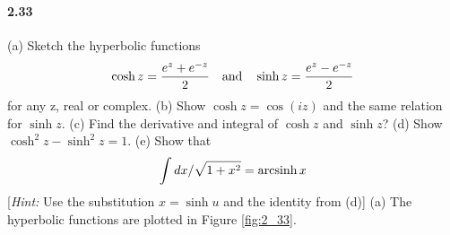 \documentclass[../problems.tex]{subfiles}
\begin{document}
\paragraph{2.33} (a) Sketch the hyperbolic functions
\begin{equation*}
    \cosh z = \frac{e^z + e^{-z}}{2} \qand \sinh z = \frac{e^z - e^{-z}}{2}
\end{equation*}
for any z, real or complex. (b) Show $\cosh z = \cos(iz)$ and the same relation for $\sinh z$. (c)
Find the derivative and integral of $\cosh z$ and $\sinh z$? (d) Show $\cosh^2 z - \sinh^2 z = 1$.
(e) Show that 
\begin{equation*}
 \int{dx/\sqrt{1+x^2}} = \operatorname{arcsinh} x 
\end{equation*}
[\textit{Hint:} Use the substitution $x = \sinh u$ and the identity from (d)]
\barh
(a) The hyperbolic functions are plotted in Figure \ref{fig:2_33}.
\end{document}
